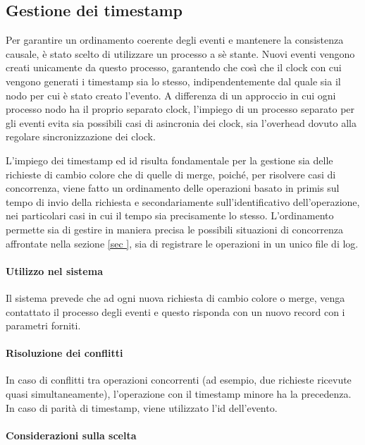 \documentclass[12pt, a4paper]{report}
\begin{document}
\subsection{Gestione dei timestamp}\label{subsec:gestione_timestamp}

Per garantire un ordinamento coerente degli eventi e mantenere la consistenza causale, \`e stato scelto di utilizzare un processo a s\`e stante. Nuovi eventi vengono creati unicamente da questo processo, garantendo che cos\`i che il clock con cui vengono generati i timestamp sia lo stesso, indipendentemente dal quale sia il nodo per cui \`e stato creato l'evento. A differenza di un approccio in cui ogni processo nodo ha il proprio separato clock, l'impiego di un processo separato per gli eventi evita sia possibili casi di asincronia dei clock, sia l'overhead dovuto alla regolare sincronizzazione dei clock.

L'impiego dei timestamp ed id risulta fondamentale per la gestione sia delle richieste di cambio colore che di quelle di merge, poiché, per risolvere casi di concorrenza, viene fatto un ordinamento delle operazioni basato in primis sul tempo di invio della richiesta e secondariamente sull'identificativo dell'operazione, nei particolari casi in cui il tempo sia precisamente lo stesso. L'ordinamento permette sia di gestire in maniera precisa le possibili situazioni di concorrenza affrontate nella sezione \ref{sec
}, sia di registrare le operazioni in un unico file di log.

\paragraph{Utilizzo nel sistema}

Il sistema prevede che ad ogni nuova richiesta di cambio colore o merge, venga contattato il processo degli eventi e questo risponda con un nuovo record con i parametri forniti.

\paragraph{Risoluzione dei conflitti}

In caso di conflitti tra operazioni concorrenti (ad esempio, due richieste ricevute quasi simultaneamente), l'operazione con il timestamp minore ha la precedenza. In caso di parit\`a di timestamp, viene utilizzato l'id dell'evento.

\paragraph{Considerazioni sulla scelta}
\end{document}
